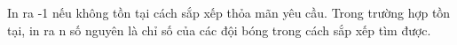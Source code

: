 In ra -1 nếu không tồn tại cách sắp xếp thỏa mãn yêu cầu. Trong trường hợp tồn tại, in ra n số nguyên là chỉ số của các đội bóng trong cách sắp xếp tìm được.